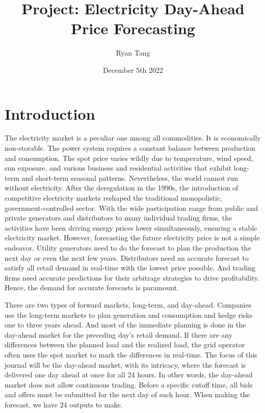 \documentclass[11pt, letterpaper, journal]{IEEEtran}
\title{Project: Electricity Day-Ahead Price Forecasting}
\author[1]{Ryan Tang}
\affil[1]{Duke University, Statistical Science}
\date{December 5th 2022}
\begin{document}
\maketitle

\section{Introduction}
The electricity market is a peculiar one among all commodities. It is economically non-storable. The power system requires a constant balance between production and consumption. The spot price varies wildly due to temperature, wind speed, sun exposure, and various business and residential activities that exhibit long-term and short-term seasonal patterns. Nevertheless, the world cannot run without electricity. After the deregulation in the 1990s, the introduction of competitive electricity markets reshaped the traditional monopolistic, government-controlled sector. With the wide participation range from public and private generators and distributors to many individual trading firms, the activities have been driving energy prices lower simultaneously, ensuring a stable electricity market. However, forecasting the future electricity price is not a simple endeavor. Utility generators need to do the forecast to plan the production the next day or even the next few years. Distributors need an accurate forecast to satisfy all retail demand in real-time with the lowest price possible. And trading firms need accurate predictions for their arbitrage strategies to drive profitability. Hence, the demand for accurate forecasts is paramount. 

There are two types of forward markets, long-term, and day-ahead. Companies use the long-term markets to plan generation and consumption and hedge risks one to three years ahead. And most of the immediate planning is done in the day-ahead market for the preceding day's retail demand. If there are any differences between the planned load and the realized load, the grid operator often uses the spot market to mark the differences in real-time. The focus of this journal will be the day-ahead market, with its intricacy, where the forecast is delivered one day ahead at once for all 24 hours. In other words, the day-ahead market does not allow continuous trading. Before a specific cutoff time, all bids and offers must be submitted for the next day of each hour. When making the forecast, we have 24 outputs to make.
\end{document}
